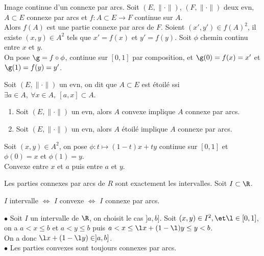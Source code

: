 \documentclass[11pt]{article}
\begin{document}
\vspace*{-0.7cm}

\begin{thm}{Image continue d'un connexe par arcs.}{}
    Soit $(E,\|\cdot\|)$, $(F,\|\cdot\|)$ deux evn, $A\subset E$ connexe par arcs et $f:A\subset E \to F$ continue sur $A$.\\
    Alors $f(A)$ est une partie connexe par arcs de $F$.
    \tcblower
    Soient $(x',y')\in f(A)^2$, il existe $(x,y)\in A^2$ tels que $x'=f(x)$ et $y'=f(y)$. Soit $\phi$ chemin continu entre $x$ et $y$.\\
    On pose $\g = f \circ \phi$, continue sur $[0,1]$ par composition, et $\g(0)=f(x)=x'$ et $\g(1)=f(y)=y'$.
\end{thm}

\vspace*{-0.7cm}

\begin{defi}{}{}
    Soit $(E,\|\cdot\|)$ un evn, on dit que $A\subset E$ est étoilé ssi $\exists a \in A, ~ \forall x \in A, ~ [a,x]\subset A$.
\end{defi}

\begin{prop}{}{}
    \begin{enumerate}
        \item Soit $(E,\|\cdot\|)$ un evn, alors $A$ convexe implique $A$ connexe par arcs.
        \item Soit $(E,\|\cdot\|)$ un evn, alors $A$ étoilé implique $A$ connexe par arcs. 
    \end{enumerate}
    \tcblower
     Soit $(x,y)\in A^2$, on pose $\phi:t\mapsto(1-t)x+ty$ continue sur $[0,1]$ et $\phi(0)=x$ et $\phi(1)=y$.\\
     Convexe entre $x$ et $a$ puis entre $a$ et $y$.
\end{prop}

\begin{prop}{}{}
    Les parties connexes par arcs de $R$ sont exactement les intervalles. Soit $I\subset \R$.
    \begin{center}
        $I$ intervalle $\iff$ $I$ convexe $\iff$ $I$ connexe par arcs.
    \end{center}
    \tcblower
    $\bullet$ Soit $I$ un intervalle de $\R$, on choisit le cas $]a,b]$.
    Soit $(x,y)\in I^2, \et \l \in [0,1]$, on a $a<x\leq b$ et $a<y\leq b$ puis $a<x\leq \l x + (1-\l)y \leq y < b$.\\
    On a donc $\l x + (1-\l y) \in ]a,b]$.\\
    $\bullet$ Les parties convexes sont toujours connexes par arcs.
\end{prop}
\end{document}

